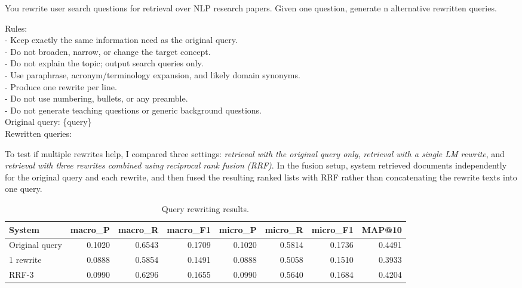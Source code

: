 \documentclass[a4paper,11pt]{article}
\begin{document}
\begin{tcolorbox}[title=Query rewriting prompt, fontupper=\raggedright, breakable]
{\small\ttfamily   You rewrite user search questions for retrieval over NLP research papers.
  Given one question, generate {n} alternative rewritten queries.

  Rules:\\
  - Keep exactly the same information need as the original query.\\
  - Do not broaden, narrow, or change the target concept.\\
  - Do not explain the topic; output search queries only.\\
  - Use paraphrase, acronym/terminology expansion, and likely domain synonyms.\\
  - Produce one rewrite per line.\\
  - Do not use numbering, bullets, or any preamble.\\
  - Do not generate teaching questions or generic background questions.\\
  
  Original query: \{query\} \\
  Rewritten queries:}
\end{tcolorbox}

To test if multiple rewrites help, I compared three settings: \textit{retrieval with the original query only}, \textit{retrieval with a single LM rewrite}, and \textit{retrieval with three rewrites combined using reciprocal rank fusion (RRF)}. In the fusion setup, system retrieved documents independently for the original query and each rewrite, and then fused the resulting ranked lists with RRF rather than concatenating the rewrite texts into one query.

  \begin{table}[t]
  \centering
  \begin{tabular}{lrrrrrrr}
  \toprule
  System & macro\_P & macro\_R & macro\_F1 & micro\_P & micro\_R & micro\_F1 & MAP@10 \\
  \midrule
  Original query & 0.1020 & 0.6543 & 0.1709 & 0.1020 & 0.5814 & 0.1736 & 0.4491 \\
  1 rewrite & 0.0888 & 0.5854 & 0.1491 & 0.0888 & 0.5058 & 0.1510 & 0.3933 \\
  RRF-3 & 0.0990 & 0.6296 & 0.1655 & 0.0990 & 0.5640 & 0.1684 & 0.4204 \\
  \bottomrule
  \end{tabular}
  \caption{Query rewriting results.}
  \label{tab:rewrite-results}
  \end{table}
\end{document}
